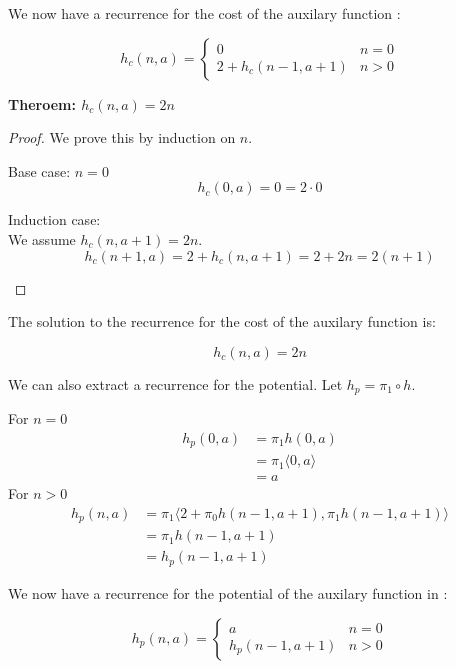 We now have a recurrence for the cost of the auxilary function :
\begin{framed}
  \begin{equation}
    h_c(n,a) = \begin{cases}
      0 & n = 0 \\
      2 + h_c(n-1,a+1) & n > 0
    \end{cases}
  \end{equation}
\end{framed}

\textbf{Theroem: $h_c(n,a) = 2n$}
\begin{proof}
  We prove this by induction on $n$.
  \begin{description}
    \item{Base case: $n=0$}\hfill \\
      \[ h_c(0,a) = 0 = 2\cdot0 \]
    \item{Induction case:}\hfill \\
      We assume $h_c(n,a+1) = 2n$.\[h_c(n+1,a) = 2 + h_c(n,a+1) = 2 + 2n = 2(n+1)\]
  \end{description}
\end{proof}  

The solution to the recurrence for the cost of the auxilary function  is:
\begin{framed}
  \[h_c(n,a) = 2n \]
\end{framed}


We can also extract a recurrence for the potential. Let $h_p = \pi_1 \circ h$.

For $n=0$
\begin{align*}
h_p(0,a) &= \pi_1 h(0,a)\\
&= \pi_1 \langle 0, a\rangle\\
&= a
\end{align*}
For $n>0$
\begin{align*}
h_p(n,a) &= \pi_1 \langle 2 + \pi_0 h(n-1,a+1), \pi_1 h(n-1,a+1)\rangle\\
&= \pi_1 h(n-1,a+1)\\
&= h_p (n-1,a+1)
\end{align*}

We now have a recurrence for the potential of the auxilary function in :
\begin{framed}
  \begin{equation}
    h_p(n,a) = \begin{cases}
      a & n = 0 \\
      h_p(n-1,a+1) & n > 0
    \end{cases}
  \end{equation}
\end{framed}

